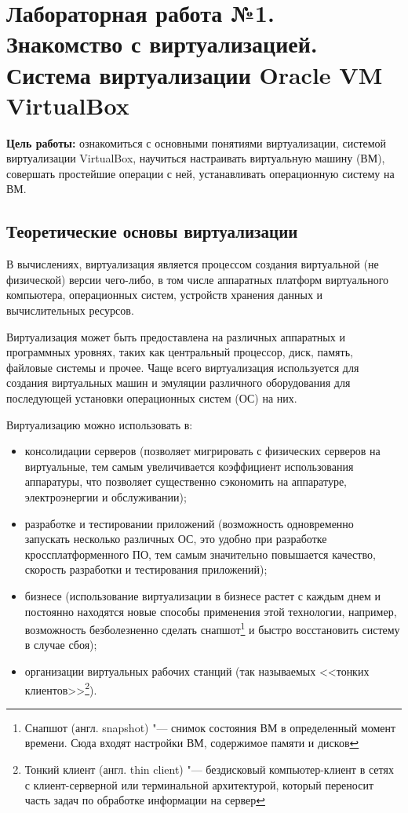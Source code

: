 \section[ЛР №1. Знакомство с виртуализацией, VirtualBox]{Лабораторная работа №1. \\
Знакомство с виртуализацией. Система виртуализации Oracle VM VirtualBox}

\textbf{Цель работы:} ознакомиться с основными понятиями виртуализации, системой виртуализации VirtualBox, научиться настраивать виртуальную машину (ВМ), совершать простейшие операции с ней, устанавливать операционную систему на ВМ.

\subsection{Теоретические основы виртуализации}

В вычислениях, виртуализация является процессом создания виртуальной (не физической) версии чего-либо, в том числе аппаратных платформ виртуального компьютера, операционных систем, устройств хранения данных и вычислительных ресурсов.

Виртуализация может быть предоставлена на различных аппаратных и программных уровнях, таких как центральный процессор, диск, память, файловые системы и прочее.
Чаще всего виртуализация используется для создания виртуальных машин и эмуляции различного оборудования для последующей установки операционных систем (ОС) на них.

Виртуализацию можно использовать в:
\begin{itemize}
    \item консолидации серверов (позволяет мигрировать с физических серверов на виртуальные, тем самым увеличивается коэффициент использования аппаратуры, что позволяет существенно сэкономить на аппаратуре, электроэнергии и обслуживании);
    \item разработке и тестировании приложений (возможность одновременно запускать несколько различных ОС, это удобно при разработке кроссплатформенного ПО, тем самым значительно повышается качество, скорость разработки и тестирования приложений);
    \item бизнесе (использование виртуализации в бизнесе растет с каждым днем и постоянно находятся новые способы применения этой технологии, например, возможность безболезненно сделать снапшот\footnote{Снапшот (англ. snapshot) "--- снимок состояния ВМ в определенный момент времени. Сюда входят настройки ВМ, содержимое памяти и дисков} и быстро восстановить систему в случае сбоя);
    \item организации виртуальных рабочих станций (так называемых <<тонких клиентов>>\footnote{Тонкий клиент (англ. thin client) "--- бездисковый компьютер-клиент в сетях с клиент-серверной или терминальной архитектурой, который переносит часть задач по обработке информации на сервер}).
\end{itemize}

